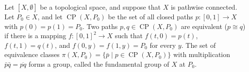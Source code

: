 Let $[X, \emptyset]$ be a topological space, and suppose that $X$ is pathwise connected. Let $P_0 \in X$, and let $\operatorname{CP}(X, P_0)$ be the set of all closed paths $p: [0, 1] \rightarrow X$ with $p(0) = p(1) = P_0$. Two paths $p, q \in \operatorname{CP}(X, P_0)$ are equivalent ($p \cong q$) if there is a mapping $f: [0, 1]^2 \rightarrow X$ such that $f(t,0) = p(t)$, $f(t,1) = q(t)$, and $f(0,y) = f(1,y) = P_0$ for every $y$. The set of equivalence classes $\pi(X, P_0) = \{\bar{p} \mid p \in \operatorname{CP}(X, P_0)\}$ with multiplication $\bar{p}\bar{q} = \overline{pq}$ forms a group, called the fundamental group of $X$ at $P_0$.
